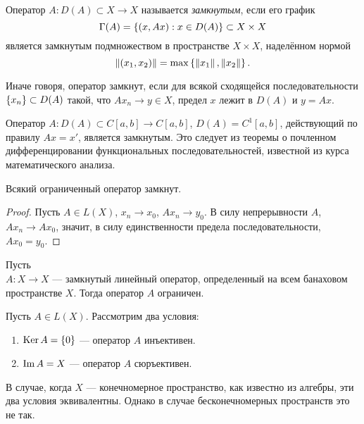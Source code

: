 \begin{definition}
    Оператор $A \colon D(A) \subset X \to X$ называется \emph{замкнутым}, если его график
    \[ \Gamma(A) = \left\{(x, Ax) : x \in D(A)\right\} \subset X \times X \]
    является замкнутым подмножеством в пространстве $X \times X$, наделённом нормой
    \[ \left\|(x_1, x_2)\right\| = \max\left\{\left\|x_1\right\|, \left\|x_2\right\|\right\}. \]
\end{definition}

Иначе говоря, оператор замкнут, 
если для всякой сходящейся последовательности $\left\{x_n\right\} \subset D(A)$ такой, что
$Ax_n \to y \in X$, предел $x$ лежит в $D(A)$ и $y = Ax$.

\begin{example}
    Оператор $A \colon D(A) \subset C[a,b] \to C[a,b]$, $D(A) = C^1[a,b]$, действующий по правилу
    $Ax = x'$, является замкнутым. Это следует из теоремы о почленном дифференцировании
    функциональных последовательностей, известной из курса математического анализа.
\end{example}

\begin{theorem}
    Всякий ограниченный оператор замкнут.
\end{theorem}

\begin{proof}
    Пусть $A \in L(X)$, $x_n \to x_0$, $Ax_n \to y_0$. В силу непрерывности $A$, $Ax_n \to Ax_0$, значит, в силу единственности предела последовательности, $Ax_0 = y_0$.
\end{proof}

\begin{theorem}
    Пусть \\$A \colon X \to X$ --- замкнутый линейный оператор, определенный на всем
    банаховом пространстве $X$. Тогда оператор $A$ ограничен.
\end{theorem}

\vspace{0.5cm}

Пусть $A \in L(X)$. Рассмотрим два условия:
\begin{enumerate}
    \item $\operatorname{Ker} A = \left\{0\right\}$ --- оператор $A$ инъективен.
    \item $\operatorname{Im} A = X$ --- оператор $A$ сюръективен.
\end{enumerate}

В случае, когда $X$ --- конечномерное пространство, как известно из алгебры, эти два условия
эквивалентны. Однако в случае бесконечномерных пространств это не так.


